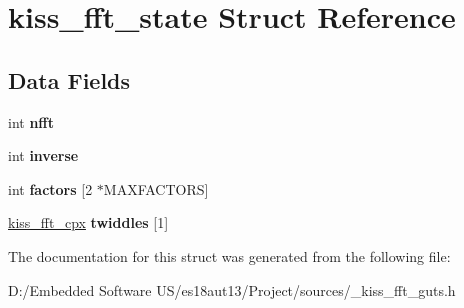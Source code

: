 \hypertarget{structkiss__fft__state}{}\section{kiss\+\_\+fft\+\_\+state Struct Reference}
\label{structkiss__fft__state}
\subsection*{Data Fields}
\begin{DoxyCompactItemize}
\item 
\hypertarget{structkiss__fft__state_aa7446bded329a40e13aef0826e349791}{}int {\bfseries nfft}\label{structkiss__fft__state_aa7446bded329a40e13aef0826e349791}

\item 
\hypertarget{structkiss__fft__state_a8faed935610ffb08bf7ad9ea8d6c81d2}{}int {\bfseries inverse}\label{structkiss__fft__state_a8faed935610ffb08bf7ad9ea8d6c81d2}

\item 
\hypertarget{structkiss__fft__state_a2d5d0897276dbac0674fae556f951d18}{}int {\bfseries factors} \mbox{[}2 $\ast$M\+A\+X\+F\+A\+C\+T\+O\+R\+S\mbox{]}\label{structkiss__fft__state_a2d5d0897276dbac0674fae556f951d18}

\item 
\hypertarget{structkiss__fft__state_aa7d1cab86ec03a8ecddfe0d91ef0bd20}{}\hyperlink{structkiss__fft__cpx}{kiss\+\_\+fft\+\_\+cpx} {\bfseries twiddles} \mbox{[}1\mbox{]}\label{structkiss__fft__state_aa7d1cab86ec03a8ecddfe0d91ef0bd20}

\end{DoxyCompactItemize}


The documentation for this struct was generated from the following file\+:\begin{DoxyCompactItemize}
\item 
D\+:/\+Embedded Software U\+S/es18aut13/\+Project/sources/\+\_\+kiss\+\_\+fft\+\_\+guts.\+h\end{DoxyCompactItemize}
